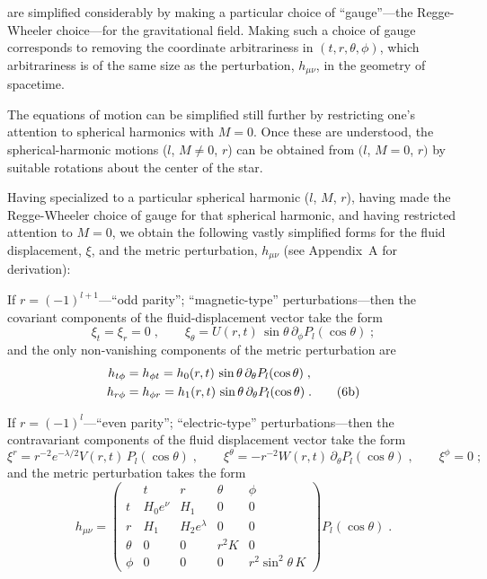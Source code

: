 are simplified considerably by making a particular choice of ``gauge''---the Regge-Wheeler
choice---for the gravitational field. Making such a choice of gauge corresponds to removing
the coordinate arbitrariness in $(t, r, \theta, \phi)$, which arbitrariness is of the same
size as the perturbation, $h_{\mu\nu}$, in the geometry of spacetime.

The equations of motion can be simplified still further by restricting one's attention
to spherical harmonics with $M = 0$. Once these are understood, the spherical-harmonic
motions ($l$, $M \neq 0$, $r$) can be obtained from $(l$, $M = 0$, $r)$ by suitable rotations about
the center of the star.

Having specialized to a particular spherical harmonic ($l$, $M$, $r$), having made the
Regge-Wheeler choice of gauge for that spherical harmonic, and having restricted attention
to $M = 0$, we obtain the following vastly simplified forms for the fluid displacement,
$\xi$, and the metric perturbation, $h_{\mu\nu}$ (see Appendix~A for derivation):

If $r = (-1)^{l+1}$---``odd parity''; ``magnetic-type'' perturbations---then the covariant
components of the fluid-displacement vector take the form
\begin{equation}
  \xi_{t} = \xi_{r} = 0 \;, \qquad
  \xi_{\theta} = U(r,t)\,\sin\theta\,\partial_{\phi} P_{l}(\cos\theta) \;;
\label{eq:6a}\tag{6a}
\end{equation}
and the only non-vanishing components of the metric perturbation are
\begin{align}
  h_{t\phi} &= h_{\phi t} = h_{0}(r,t)\,\sin\theta\,\partial_{\theta} P_{l}(\cos\theta) \;,\notag\\
  h_{r\phi} &= h_{\phi r} = h_{1}(r,t)\,\sin\theta\,\partial_{\theta} P_{l}(\cos\theta) \;.
\label{eq:6b}\tag{6b}
\end{align}

If $r = (-1)^{l}$---``even parity''; ``electric-type'' perturbations---then the contravariant
components of the fluid displacement vector take the form
\begin{equation}
  \xi^{r} = r^{-2} e^{-\lambda/2} V(r,t)\, P_{l}(\cos\theta) \;, \qquad
  \xi^{\theta} = -r^{-2} W(r,t)\,\partial_{\theta} P_{l}(\cos\theta) \;, \qquad
  \xi^{\phi} = 0 \;;
\label{eq:7a}\tag{7a}
\end{equation}
and the metric perturbation takes the form
\begin{equation}
  h_{\mu\nu} =
  \left(
  \begin{array}{c|cccc}
     & t & r & \theta & \phi \\
    \hline
    t & H_{0} e^{\nu} & H_{1} & 0 & 0 \\
    r & H_{1} & H_{2} e^{\lambda} & 0 & 0 \\
    \theta & 0 & 0 & r^{2} K & 0 \\
    \phi & 0 & 0 & 0 & r^{2} \sin^{2}\!\theta\, K
  \end{array}
  \right)
  P_{l}(\cos\theta) \;.
\label{eq:7b}\tag{7b}
\end{equation}

